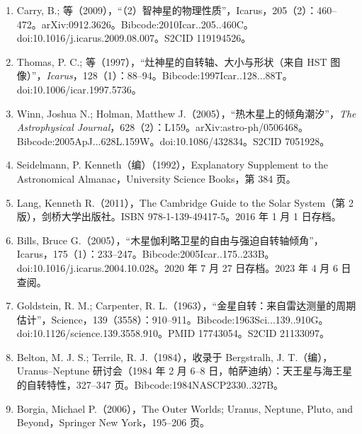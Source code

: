 \begin{enumerate}
\item Carry, B.; 等（2009），“（2）智神星的物理性质”，Icarus，205（2）：460–472。arXiv:0912.3626。Bibcode:2010Icar..205..460C。doi:10.1016/j.icarus.2009.08.007。S2CID 119194526。
\item Thomas, P. C.; 等（1997），“灶神星的自转轴、大小与形状（来自 HST 图像）”，\textit{Icarus}，128（1）：88–94。Bibcode:1997Icar..128...88T。doi:10.1006/icar.1997.5736。
\item Winn, Joshua N.; Holman, Matthew J.（2005），“热木星上的倾角潮汐”，\textit{The Astrophysical Journal}，628（2）：L159。arXiv:astro-ph/0506468。Bibcode:2005ApJ...628L.159W。doi:10.1086/432834。S2CID 7051928。
\item Seidelmann, P. Kenneth（编）（1992），Explanatory Supplement to the Astronomical Almanac，University Science Books，第 384 页。
\item Lang, Kenneth R.（2011），The Cambridge Guide to the Solar System（第 2 版），剑桥大学出版社。ISBN 978-1-139-49417-5。2016 年 1 月 1 日存档。
\item Bills, Bruce G.（2005），“木星伽利略卫星的自由与强迫自转轴倾角”，Icarus，175（1）：233–247。Bibcode:2005Icar..175..233B。doi:10.1016/j.icarus.2004.10.028。2020 年 7 月 27 日存档。2023 年 4 月 6 日查阅。
\item Goldstein, R. M.; Carpenter, R. L.（1963），“金星自转：来自雷达测量的周期估计”，Science，139（3558）：910–911。Bibcode:1963Sci...139..910G。doi:10.1126/science.139.3558.910。PMID 17743054。S2CID 21133097。
\item Belton, M. J. S.; Terrile, R. J.（1984），收录于 Bergstralh, J. T.（编），Uranus–Neptune 研讨会（1984 年 2 月 6–8 日，帕萨迪纳）：天王星与海王星的自转特性，327–347 页。Bibcode:1984NASCP2330..327B。
\item Borgia, Michael P.（2006），The Outer Worlds; Uranus, Neptune, Pluto, and Beyond，Springer New York，195–206 页。



\end{enumerate}








